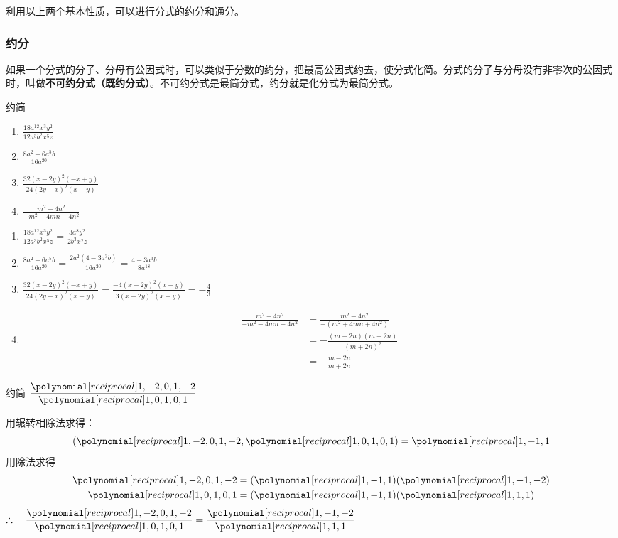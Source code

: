 利用以上两个基本性质，可以进行分式的约分和通分。

\subsubsection{约分}

如果一个分式的分子、分母有公因式时，可以类似于分数的约分，把最高公因式约去，使分式化简。分式的分子与分母没有非零次的公因式时，叫做\textbf{不可约分式（既约分式）}。不可约分式是最简分式，约分就是化分式为最简分式。

\begin{example}
    约简
\begin{enumerate}
    \item $\frac{18 a^{12} x^{3} y^{2}}{12 a^{3} b^{2} x^{5} z}$
    \item $\frac{8 a^{2}-6 a^{5} b}{16 a^{20}}$
    \item $\frac{32(x-2 y)^{2}(-x+y)}{24(2 y-x)^{2}(x-y)}$
    \item $\frac{m^{2}-4 n^{2}}{-m^{2}-4 m n-4 n^{2}}$
\end{enumerate}
\end{example}

\begin{solution}
\begin{enumerate}
    \item $\frac{18 a^{12} x^{3} y^{2}}{12 a^{3} b^{2} x^{5} z}=\frac{3 a^{8} y^{2}}{2 b^{3} x^{2} z}$
    \item $\frac{8 a^{2}-6 a^{5} b}{16 a^{20}}  =\frac{2 a^{2}\left(4-3 a^{3} b\right)}{16 a^{20}} = \frac{4-3 a^{3} b}{8 a^{18}} $
    \item $ \frac{32(x-2 y)^{2}(-x+y)}{24(2 y-x)^{2}(x-y)}  =\frac{-4(x-2 y)^{2}(x-y)}{3(x-2 y)^{2}(x-y)}=-\frac{4}{3}$
    \item \[\begin{split}
        \frac{m^{2}-4 n^{2}}{-m^{2}-4 m n-4 n^{2}} &=
    \frac{m^{2}-4 n^{2}}{-\left(m^{2}+4 m n+4 n^{2}\right)}\\&=-\frac{(m-2n)(m+2n)}{(m+2n)^2}\\&=-\frac{m-2n}{m+2n}
    \end{split} \]
\end{enumerate}
\end{solution}

\begin{example}
    约简 $\frac{\poly{1,-2,0,1,-2}}{\poly{1,0,1,0,1}}$
\end{example}

\begin{solution}
    用辗转相除法求得：
\[(\poly{1,-2,0,1,-2}, \poly{1,0,1,0,1})=\poly{1,-1,1}\]
用除法求得
\[\begin{split}
    \poly{1,-2,0,1,-2}&=(\poly{1,-1,1})(\poly{1,-1,-2})\\
    \poly{1,0,1,0,1}&=(\poly{1,-1,1})(\poly{1,1,1})
\end{split}\]
$\therefore\quad \frac{\poly{1,-2,0,1,-2}}{\poly{1,0,1,0,1}}=\frac{\poly{1,-1,-2}}{\poly{1,1,1}}$
\end{solution}

